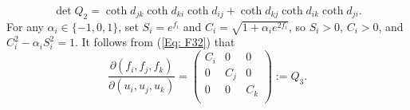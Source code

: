 \documentclass[12pt]{amsart}
\theoremstyle{definition}
\begin{document}
\begin{equation}\label{Eq: F23}
\det Q_2=\coth d_{jk}\coth d_{ki}\coth d_{ij}
+\coth d_{kj}\coth d_{ik}\coth d_{ji}.
\end{equation}
For any $\alpha_i\in \{-1,0,1\}$,
set $S_i=e^{f_i}$ and $C_i=\sqrt{1+\alpha_ie^{2f_i}}$,
so $S_i>0$, $C_i>0$, and $C_i^2-\alpha_iS_i^2=1$.
It follows from (\ref{Eq: F32}) that
\begin{equation}\label{Eq: Q_3}
\frac{\partial(f_i,f_j,f_k)}
{\partial(u_i,u_j,u_k)}
=\left(
   \begin{array}{ccc}
     C_i & 0 & 0 \\
     0 & C_j & 0 \\
     0 & 0 & C_k \\
   \end{array}
 \right)
 :=Q_3.
\end{equation}
\end{document}
